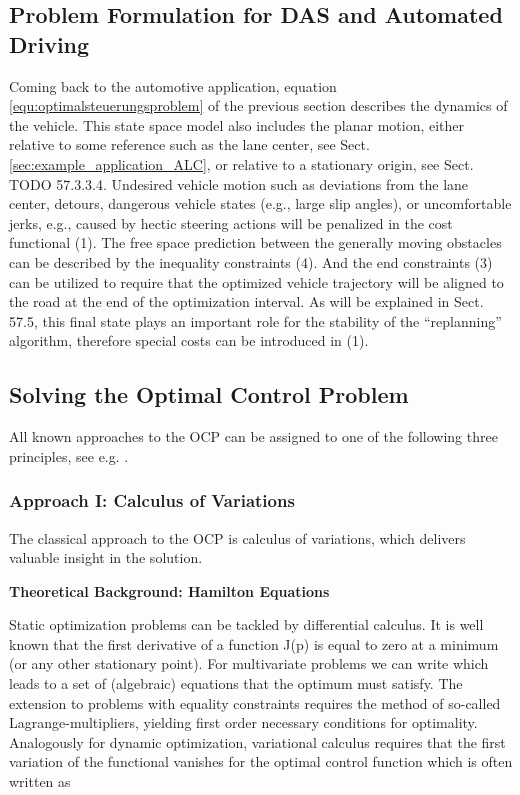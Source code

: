 \subsection{Problem Formulation for DAS and Automated Driving}
Coming back to the automotive application, equation \eqref{equ:optimalsteuerungsproblem} of the previous section describes the dynamics of the vehicle. This state space model also includes the planar motion, either relative to some reference such as the lane center, see Sect. \ref{sec:example_application_ALC}, or relative to a stationary origin, see Sect. TODO 57.3.3.4. Undesired vehicle motion such as deviations from the lane center, detours, dangerous vehicle states (e.g., large slip angles), or uncomfortable jerks, e.g., caused by hectic steering actions will be penalized in the cost functional (1). The free space prediction between the generally moving obstacles can be described by the inequality constraints (4). And the end constraints (3) can be utilized to require that the optimized vehicle trajectory will be aligned to the road at the end of the optimization interval. As will be explained in Sect. 57.5, this final state plays an important role for the stability of the “replanning” algorithm, therefore special costs
can be introduced in (1). 

\subsection{Solving the Optimal Control Problem}
All known approaches to the OCP can be assigned to one of the following three principles, see e.g. \cite{diehl_fast_multipleshooting}.
\subsubsection{Approach I: Calculus of Variations}
The classical approach to the OCP is calculus of variations, which delivers valuable insight in the solution. 

\textbf{Theoretical Background: Hamilton Equations}

Static optimization problems can be tackled by differential calculus. It is well known that the first derivative of a function J(p) is equal to zero at a minimum (or any other stationary point). For multivariate problems we can write 
which leads to a set of (algebraic) equations that the optimum 
must satisfy. The extension to problems with equality constraints requires the method of so-called Lagrange-multipliers, yielding first order necessary conditions for optimality.
Analogously for dynamic optimization, variational calculus requires that the first variation of the functional %
vanishes for the optimal control function %
which is often written as 

